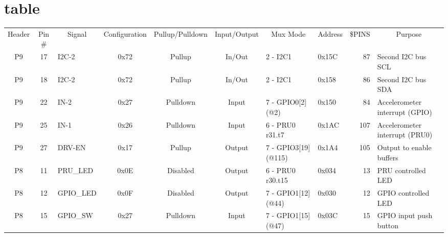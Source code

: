 \documentclass[a4paper,11pt]{article}
\begin{document}
\section{table}
\begin{tabular}{llllllllll}
\multicolumn{1}{c}{Header} & \multicolumn{1}{c}{Pin \#} & \multicolumn{1}{c}{Signal} & \multicolumn{1}{c}{Configuration} & \multicolumn{1}{c}{Pullup/Pulldown} & \multicolumn{1}{c}{Input/Output} & \multicolumn{1}{c}{Mux Mode} & \multicolumn{1}{c}{Address} & \multicolumn{1}{c}{\$PINS} & \multicolumn{1}{c}{Purpose} \\ 
\multicolumn{1}{c}{P9} & \multicolumn{1}{c}{17} & I2C-2 & \multicolumn{1}{c}{0x72} & \multicolumn{1}{c}{Pullup} & \multicolumn{1}{c}{In/Out} & 2 - I2C1 & 0x15C & \multicolumn{1}{r}{87} & Second I2C bus SCL \\ 
\multicolumn{1}{c}{P9} & \multicolumn{1}{c}{18} & I2C-2 & \multicolumn{1}{c}{0x72} & \multicolumn{1}{c}{Pullup} & \multicolumn{1}{c}{In/Out} & 2 - I2C1 & 0x158 & \multicolumn{1}{r}{86} & Second I2C bus SDA \\ 
\multicolumn{1}{c}{P9} & \multicolumn{1}{c}{22} & IN-2 & \multicolumn{1}{c}{0x27} & \multicolumn{1}{c}{Pulldown} & \multicolumn{1}{c}{Input} & 7 - GPIO0[2] (@2) & 0x150 & \multicolumn{1}{r}{84} & Accelerometer interrupt (GPIO) \\ 
\multicolumn{1}{c}{P9} & \multicolumn{1}{c}{25} & IN-1  & \multicolumn{1}{c}{0x26} & \multicolumn{1}{c}{Pulldown} & \multicolumn{1}{c}{Input} & 6 - PRU0 r31.t7 & 0x1AC & \multicolumn{1}{r}{107} & Accelerometer interrupt (PRU0) \\ 
\multicolumn{1}{c}{P9} & \multicolumn{1}{c}{27} & DRV-EN & \multicolumn{1}{c}{0x17} & \multicolumn{1}{c}{Pullup} & \multicolumn{1}{c}{Output} & 7 - GPIO3[19] (@115) & 0x1A4 & \multicolumn{1}{r}{105} & Output to enable buffers \\ 
\multicolumn{1}{c}{P8} & \multicolumn{1}{c}{11} & PRU\_LED & \multicolumn{1}{c}{0x0E} & \multicolumn{1}{c}{Disabled} & \multicolumn{1}{c}{Output} & 6 - PRU0 r30.t15 & 0x034 & \multicolumn{1}{r}{13} & PRU controlled LED \\ 
\multicolumn{1}{c}{P8} & \multicolumn{1}{c}{12} & GPIO\_LED & \multicolumn{1}{c}{0x0F} & \multicolumn{1}{c}{Disabled} & \multicolumn{1}{c}{Output} & 7 - GPIO1[12] (@44) & 0x030 & \multicolumn{1}{r}{12} & GPIO controlled LED \\ 
\multicolumn{1}{c}{P8} & \multicolumn{1}{c}{15} & GPIO\_SW & \multicolumn{1}{c}{0x27} & \multicolumn{1}{c}{Pulldown} & \multicolumn{1}{c}{Input} & 7 - GPIO1[15] (@47) & 0x03C & \multicolumn{1}{r}{15} & GPIO input push button \\ 

\end{tabular}
\end{document}

